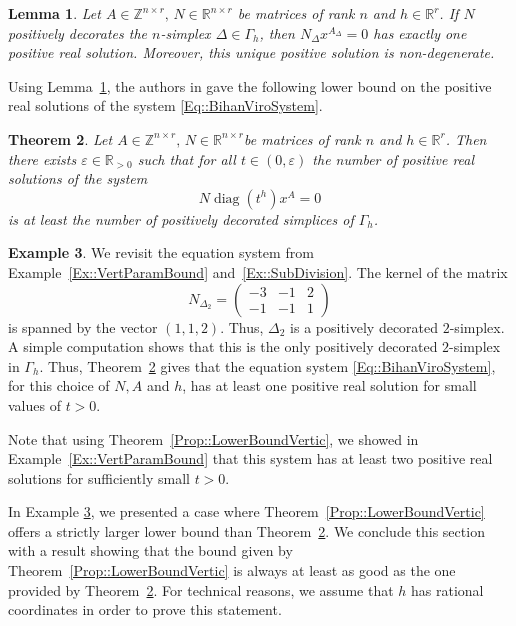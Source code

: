 \documentclass{article}
\newtheorem{theorem}{Theorem}[section]
\newtheorem{lemma}[theorem]{Lemma}
\theoremstyle{definition}
\newtheorem{example}[theorem]{Example}
\DeclareMathOperator{\diag}{diag}
\newcommand{\Z}{\mathbb{Z}}
\begin{document}
\begin{lemma} \cite[Proposition 3.3]{PolyhedralMethodSparsePositive}
\label{Lemma::SubSolution}
Let  $A  \in \Z^{n \times r},\, N \in \mathbb{R}^{n \times r}$ be matrices of rank $n$ and $h \in \mathbb{R}^r$. If $N$ positively decorates the $n$-simplex $\Delta \in \Gamma_h$, then $N_\Delta x^{A_\Delta} = 0$ has exactly one positive real solution. Moreover, this unique positive solution is non-degenerate.  
\end{lemma}

Using Lemma~\ref{Lemma::SubSolution}, the authors in \cite{PolyhedralMethodSparsePositive} gave the following lower bound on the positive real solutions of the system \eqref{Eq::BihanViroSystem}.

\begin{theorem}
\label{Thm:Bihan}
Let  $A  \in \Z^{n \times r},\, N \in \mathbb{R}^{n \times r}$be matrices of rank $n$ and $h \in \mathbb{R}^r$.
Then there exists $\varepsilon \in \mathbb{R}_{>0}$ such that for all $t \in (0,\varepsilon)$ the number of positive real solutions of the system \[N \diag(t^h) x^A = 0\]
   is at least the number of positively decorated simplices of $\Gamma_h$.
\end{theorem}

\begin{example}
\label{Ex:BetterBound}
    We revisit the equation system from Example~\ref{Ex::VertParamBound} and~\ref{Ex::SubDivision}. The kernel of the matrix 
    \[N_{\Delta_2} = \begin{pmatrix}
        -3 & -1 & 2\\
        -1 & -1 & 1
    \end{pmatrix}\]
    is spanned by the vector $(1,1,2)$. Thus, $\Delta_2$ is a positively decorated $2$-simplex. A simple computation shows that this is the only positively decorated $2$-simplex in $\Gamma_h$. Thus, Theorem~\ref{Thm:Bihan} gives that the equation system  \eqref{Eq::BihanViroSystem}, for this choice of $N,A$ and $h$, has at least one positive real solution for small values of $t > 0$. 
    
    Note that using Theorem~\ref{Prop::LowerBoundVertic}, we showed  in Example~\ref{Ex::VertParamBound} that this system has at least two positive real solutions for sufficiently small $t > 0$.
\end{example}

In Example \ref{Ex:BetterBound}, we presented a case where Theorem~\ref{Prop::LowerBoundVertic} offers a strictly larger lower bound than Theorem~\ref{Thm:Bihan}. We conclude this section with a result showing that the bound given by Theorem~\ref{Prop::LowerBoundVertic} is always at least as good as the one provided by Theorem~\ref{Thm:Bihan}.
For technical reasons, we assume that $h$ has rational coordinates in order to prove this statement.
\end{document}
